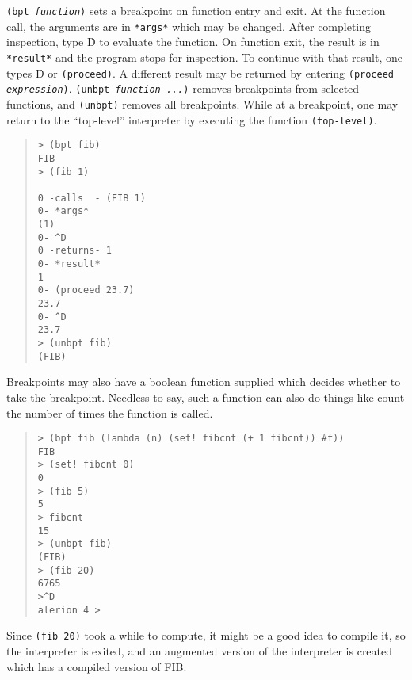 \documentclass[11pt]{article}
\begin{document}
\texttt{(bpt \textnormal{\emph{function}})} sets a breakpoint on function entry and
exit. At the function call, the arguments are in \texttt{*args*}
which may be changed. After completing inspection, type \^D to
evaluate the function.  On function exit, the result is in
\texttt{*result*} and the program stops for inspection.  To
continue with that result, one types \^D or \texttt{(proceed)}.  A
different result may be returned by entering \texttt{(proceed
\textnormal{\emph{expression}})}.
\texttt{(unbpt \textnormal{\emph{function ...}})} removes
breakpoints from selected functions, and \texttt{(unbpt)} removes
all breakpoints. While at a breakpoint, one may return to the
``top-level'' interpreter by executing the function
\texttt{(top-level)}.

\begin{small}
\begin{quote}
\begin{verbatim}
> (bpt fib)
FIB
> (fib 1)

0 -calls  - (FIB 1)
0- *args*
(1)
0- ^D
0 -returns- 1
0- *result*
1
0- (proceed 23.7)
23.7
0- ^D
23.7
> (unbpt fib)
(FIB)
\end{verbatim}
\end{quote}
\end{small}

Breakpoints may also have a boolean function supplied which decides
whether to take the breakpoint.  Needless to say, such a function can
also do things like count the number of times the function is called.

\begin{small}
\begin{quote}
\begin{verbatim}
> (bpt fib (lambda (n) (set! fibcnt (+ 1 fibcnt)) #f))
FIB
> (set! fibcnt 0)
0
> (fib 5)
5
> fibcnt
15
> (unbpt fib)
(FIB)
> (fib 20)
6765
>^D
alerion 4 >
\end{verbatim}
\end{quote}
\end{small}

Since \texttt{(fib 20)} took a while to compute, it might be a good idea
to compile it, so the interpreter is exited, and an augmented version
of the interpreter is created which has a compiled version of FIB.
\end{document}
